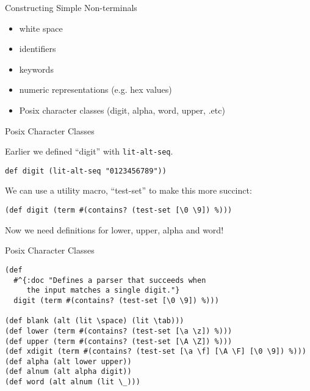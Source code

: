 \documentclass[presentation]{beamer}
\begin{document}
\begin{frame}{Constructing Simple Non-terminals}
\begin{itemize}
\item white space
\item identifiers
\item keywords
\item numeric representations (e.g. hex values)
\item Posix character classes (digit, alpha, word, upper, .etc)
\end{itemize}
\end{frame}

\begin{frame}[fragile]{Posix Character Classes}

 Earlier we defined ``digit''  with \texttt{lit-alt-seq}.

\begin{verbatim}
def digit (lit-alt-seq "0123456789"))
\end{verbatim}

We can use a utility macro, ``test-set'' to make this more
succinct:

\begin{verbatim}
(def digit (term #(contains? (test-set [\0 \9]) %)))
\end{verbatim}

Now we need definitions for lower, upper, alpha and word!
\end{frame}

\begin{frame}[fragile]{Posix Character Classes}


\begin{verbatim}
(def
  #^{:doc "Defines a parser that succeeds when
     the input matches a single digit."}
  digit (term #(contains? (test-set [\0 \9]) %)))

(def blank (alt (lit \space) (lit \tab)))
(def lower (term #(contains? (test-set [\a \z]) %)))
(def upper (term #(contains? (test-set [\A \Z]) %)))
(def xdigit (term #(contains? (test-set [\a \f] [\A \F] [\0 \9]) %)))
(def alpha (alt lower upper))
(def alnum (alt alpha digit))
(def word (alt alnum (lit \_)))
\end{verbatim}

\end{frame}
\end{document}
